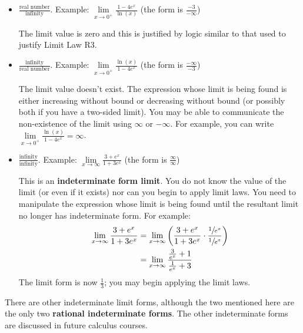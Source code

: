 \documentclass[12pt,]{book}
\newcommand{\terminology}[1]{\textbf{#1}}
\theoremstyle{plain}
\theoremstyle{definition}
\numberwithin{equation}{section}
\newcommand{\fe}[2]{#1\mathopen{}\left(#2\right)\mathclose{}}
\begin{document}
\begin{itemize}[label=\textbullet]
\item{}\(\frac{\text{real number}}{\text{infinity}}\). Example: \(\lim\limits_{x\to0^{+}}\frac{1-4e^{x}}{\fe{\ln}{x}}\) (the form is \(\frac{-3}{-\infty}\))%

                \par
The limit value is zero and this is justified by logic similar to that used to justify Limit Law R3.%
\end{itemize}
\begin{itemize}[label=\textbullet]
\item{}\(\frac{\text{infinity}}{\text{real number}}\). Example: \(\lim\limits_{x\to0^{+}}\frac{\fe{\ln}{x}}{1-4e^{x}}\) (the form is \(\frac{-\infty}{-3}\))%

                \par
The limit value doesn't exist.  The expression whose limit is being found is either increasing without bound or decreasing without bound (or possibly both if you have a two-sided limit).   You may be able to communicate the non-existence of the limit using \(\infty\) or \(-\infty\). For example, you can write \(\lim\limits_{x\to0^{+}}\frac{\fe{\ln}{x}}{1-4e^{x}}=\infty\).%
\end{itemize}
\begin{itemize}[label=\textbullet]
\item{}\(\frac{\text{infinity}}{\text{infinity}}\). Example: \(\lim\limits_{x\to\infty}\frac{3+e^x}{1+3e^x}\) (the form is \(\frac{\infty}{\infty}\))%

                \par
This is an \terminology{indeterminate form limit}. You do not know the value of the limit (or even if it exists) nor can you begin to apply limit laws.  You need to manipulate the expression whose limit is being found until the resultant limit no longer has indeterminate form.  For example:\begin{align*}
\lim_{x\to\infty}\frac{3+e^x}{1+3e^x}&=\lim_{x\to\infty}\left(\frac{3+e^x}{1+3e^x}\cdot\frac{\sfrac{1}{e^x}}{\sfrac{1}{e^x}}\right)\\
&=\lim_{x\to\infty}\frac{\frac{3}{e^x}+1}{\frac{1}{e^x}+3}
\end{align*}The limit form is now \(\frac{1}{3}\); you may begin applying the limit laws.%
\end{itemize}
There are other indeterminate limit forms, although the two mentioned here are the only two \terminology{rational indeterminate forms}.  The other indeterminate forms are discussed in future calculus courses.%
\typeout{************************************************}
\typeout{************************************************}
\end{document}

